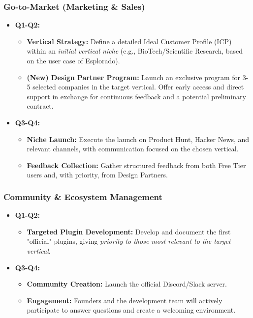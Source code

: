 \documentclass[11pt, a4paper, oneside]{article}
\begin{document}
\subsubsection{Go-to-Market (Marketing \& Sales)}
\begin{itemize}[leftmargin=*]
    \item \textbf{Q1-Q2:}
    \begin{itemize}
        \item \textbf{Vertical Strategy:} Define a detailed Ideal Customer Profile (ICP) within an \textit{initial vertical niche} (e.g., BioTech/Scientific Research, based on the user case of Esplorado).
        \item \textbf{(New) Design Partner Program:} Launch an exclusive program for 3-5 selected companies in the target vertical. Offer early access and direct support in exchange for continuous feedback and a potential preliminary contract.
    \end{itemize}
    \item \textbf{Q3-Q4:}
    \begin{itemize}
        \item \textbf{Niche Launch:} Execute the launch on Product Hunt, Hacker News, and relevant channels, with communication focused on the chosen vertical.
        \item \textbf{Feedback Collection:} Gather structured feedback from both Free Tier users and, with priority, from Design Partners.
    \end{itemize}
\end{itemize}

\subsubsection{Community \& Ecosystem Management}
\begin{itemize}[leftmargin=*]
    \item \textbf{Q1-Q2:}
    \begin{itemize}
        \item \textbf{Targeted Plugin Development:} Develop and document the first "official" plugins, giving \textit{priority to those most relevant to the target vertical}.
    \end{itemize}
    \item \textbf{Q3-Q4:}
    \begin{itemize}
        \item \textbf{Community Creation:} Launch the official Discord/Slack server.
        \item \textbf{Engagement:} Founders and the development team will actively participate to answer questions and create a welcoming environment.
    \end{itemize}
\end{itemize}
\end{document}
